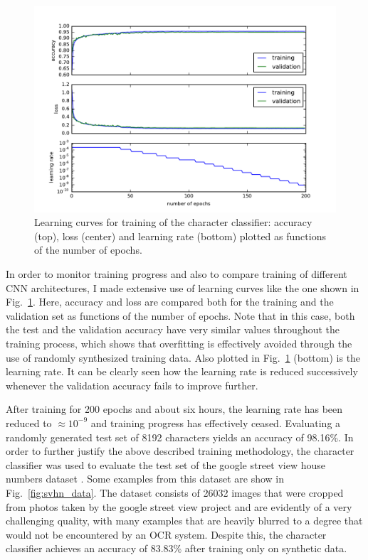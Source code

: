 \documentclass[12pt]{article}
\newcommand\figref[1]{Fig.~\ref{fig:#1}}
\begin{document}
%

\begin{figure}[ht]
  \centering
  \includegraphics{fig/learning_curve}
  \caption{
    Learning curves for training of the character classifier:
    accuracy (top), loss (center) and learning rate (bottom) plotted as functions of
    the number of epochs.
    \label{fig:learning_curve}
  }
\end{figure}

In order to monitor training progress and also to compare training of different CNN architectures,
I made extensive use of learning curves like the one shown in \figref{learning_curve}.
Here, accuracy and loss are compared both for the training and the validation set as functions
of the number of epochs. Note that in this case, both the test and the validation accuracy
have very similar values throughout the training process,
which shows that overfitting is effectively avoided through
the use of randomly synthesized training data. Also plotted in \figref{learning_curve} (bottom)
is the learning rate. It can be clearly seen how the learning rate is reduced successively
whenever the validation accuracy fails to improve further.

After training for 200 epochs and about six hours, the learning rate has been reduced to $\approx 10^{-9}$ and training progress
has effectively ceased. Evaluating a randomly generated test set of 8192 characters yields
an accuracy of 98.16\%. In order to further justify the above described training methodology,
the character classifier was used to evaluate the test set of the google street view house numbers dataset
\cite{Netzer2011,TheStree9:online}. Some examples from this dataset are show in \figref{svhn_data}.
The dataset consists of 26032 images that were cropped from photos taken by the
google street view project and are evidently of a very challenging quality, with many examples that are heavily blurred to a
degree that would not be encountered by an OCR system. Despite this, the character classifier
achieves an accuracy of 83.83\% after training only on synthetic data.
\end{document}
